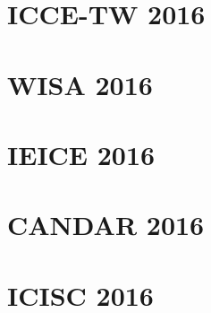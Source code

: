 \documentclass[
11pt, %
english, %
singlespacing, %
headsepline, %
]{MastersDoctoralThesis} %
\makeatletter
\newcommand{\extraPartText}[1]{\def\@extraPartText{#1}}
\makeatother
\begin{document}

\mainmatter %

\pagestyle{thesis} %
 

%

% 
\chapter{ICCE-TW 2016} 

\chapter{WISA 2016} 
 
\chapter{IEICE 2016} 
 
\chapter{CANDAR 2016} 
 
\chapter{ICISC 2016} 
 
% 
\end{document}
